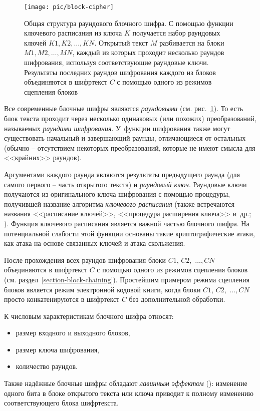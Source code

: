 \begin{figure}[!b]
	\centering
	\texttt{[image: pic/block-cipher]}
  \caption{Общая структура раундового блочного шифра. С помощью функции ключевого расписания из ключа $K$ получается набор раундовых ключей $K1, K2, \dots, KN$. Открытый текст $M$ разбивается на блоки $M1, M2, \dots, MN$, каждый из которых проходит несколько раундов шифрования, используя соответствующие раундовые ключи. Результаты последних раундов шифрования каждого из блоков объединяются в шифртекст $C$ с помощью одного из режимов сцепления блоков}
  \label{fig:block-cipher}
\end{figure}

Все современные блочные шифры являются \emph{раундовыми} (см. рис.~\ref{fig:block-cipher}). То есть блок текста проходит через несколько одинаковых (или похожих) преобразований, называемых \emph{раундами шифрования}. У~функции шифрования также могут существовать начальный и завершающий раунды, отличающиеся от остальных (обычно -- отсутствием некоторых преобразований, которые не имеют смысла для <<крайних>> раундов).

Аргументами каждого раунда являются результаты предыдущего раунда (для самого первого -- часть открытого текста) и \emph{раундовый ключ}. Раундовые ключи получаются из оригинального ключа шифрования с помощью процедуры, получившей название алгоритма \emph{ключевого расписания} (также встречаются названия <<расписание ключей>>, <<процедура расширения ключа>> и~др.; ). Функция ключевого расписания является важной частью блочного шифра. На потенциальной слабости этой функции основаны такие криптографические атаки, как атака на основе связанных ключей и атака скольжения.

После прохождения всех раундов шифрования блоки $C1$, $C2$,~$\dots, CN$ объединяются в шифртекст $C$ с помощью одного из режимов сцепления блоков (см. раздел~\ref{section-block-chaining}). Простейшим примером режима сцепления блоков является режим электронной кодовой книги, когда блоки $C1$, $C2$,~$\dots, CN$ просто конкатенируются в шифртекст $C$ без дополнительной обработки.

К числовым характеристикам блочного шифра относят:
\begin{itemize}
	\item размер входного и выходного блоков,
	\item размер ключа шифрования,
	\item количество раундов.
\end{itemize}

Также надёжные блочные шифры обладают \emph{лавинным эффектом} (): изменение одного бита в блоке открытого текста или ключа приводит к полному изменению соответствующего блока шифртекста.
